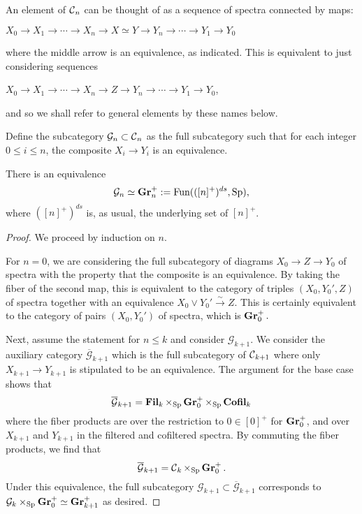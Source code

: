 An element of $\operatorname{\mathcal{C}}_n$ can be thought of as a sequence of spectra connected by maps:
\begin{center}
$X_0 \longrightarrow X_1 \longrightarrow \cdots \longrightarrow X_n \longrightarrow X \simeq Y \longrightarrow Y_n \longrightarrow \cdots \longrightarrow Y_1 \longrightarrow Y_0$
\end{center}
where the middle arrow is an equivalence, as indicated.  This is equivalent to just considering sequences
\begin{center}
$X_0 \longrightarrow X_1 \longrightarrow \cdots \longrightarrow X_n \longrightarrow Z \longrightarrow Y_n \longrightarrow \cdots \longrightarrow Y_1 \longrightarrow Y_0$,
\end{center}
and so we shall refer to general elements by these names below.   


Define the subcategory $\mathcal{G}_n\subset \operatorname{\mathcal{C}}_n$ as the full subcategory such that for each integer $0\leq i\leq n$, the composite $X_i \longrightarrow Y_i$ is an equivalence.  

\begin{lem}
There is an equivalence $$\mathcal{G}_n \simeq \operatorname{\textbf{Gr}}_n^+ := \operatorname{\text{Fun}}(([n]^{+})^{ds}, \operatorname{\text{Sp}}),$$
where $([n]^+)^{ds}$ is, as usual, the underlying set of $[n]^+$.  
\end{lem}
\begin{proof}
We proceed by induction on $n$.  

For $n=0$, we are considering the full subcategory of diagrams $X_0 \to Z \to Y_0$ of spectra with the property that the composite is an equivalence.  By taking the fiber of the second map, this is equivalent to the category of triples $(X_0, Y_0',Z)$ of spectra together with an equivalence $X_0 \vee Y_0' \xrightarrow{\sim} Z.$   This is  certainly equivalent to the category of pairs $(X_0, Y_0')$ of spectra, which is $\operatorname{\textbf{Gr}}_0^+.$  

Next, assume the statement for $n\leq k$ and consider $\mathcal{G}_{k+1}.$  We consider the auxiliary category $\overline{\mathcal{G}}_{k+1}$ which is the full subcategory of $\operatorname{\mathcal{C}}_{k+1}$ where only $X_{k+1} \to Y_{k+1}$ is stipulated to be an equivalence.    The argument for the base case shows that $$\overline{\mathcal{G}}_{k+1} = \operatorname{\textbf{Fil}}_k \times_{\operatorname{\text{Sp}}} \operatorname{\textbf{Gr}}_0^+ \times_{\operatorname{\text{Sp}}} \operatorname{\textbf{Cofil}}_k$$ where the fiber products are over the restriction to $0\in [0]^+$ for $\operatorname{\textbf{Gr}}_0^+$, and over $X_{k+1}$ and $Y_{k+1}$ in the filtered and cofiltered spectra.  By commuting the fiber products, we find that $$\overline{\mathcal{G}}_{k+1} = \operatorname{\mathcal{C}}_k \times_{\operatorname{\text{Sp}}} \operatorname{\textbf{Gr}}_0^+.$$  Under this equivalence, the full subcategory $\mathcal{G}_{k+1} \subset \overline{\mathcal{G}}_{k+1}$ corresponds to $\mathcal{G}_k \times_{\operatorname{\text{Sp}}} \operatorname{\textbf{Gr}}_0^+ \simeq \operatorname{\textbf{Gr}}_{k+1}^+$ as desired.  

\end{proof}



